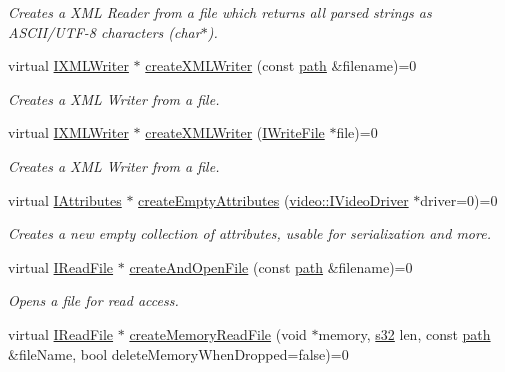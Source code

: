\begin{DoxyCompactItemize}
\begin{DoxyCompactList}\small\item\em Creates a X\+ML Reader from a file which returns all parsed strings as A\+S\+C\+I\+I/\+U\+T\+F-\/8 characters (char$\ast$). \end{DoxyCompactList}\item 
virtual \hyperlink{classirr_1_1io_1_1IXMLWriter}{I\+X\+M\+L\+Writer} $\ast$ \hyperlink{classirr_1_1io_1_1IFileSystem_a0737712d1c90001e5765ef46912c616d}{create\+X\+M\+L\+Writer} (const \hyperlink{namespaceirr_1_1io_a6468281622ce3a1c46b72e19f32dded5}{path} \&filename)=0
\begin{DoxyCompactList}\small\item\em Creates a X\+ML Writer from a file. \end{DoxyCompactList}\item 
virtual \hyperlink{classirr_1_1io_1_1IXMLWriter}{I\+X\+M\+L\+Writer} $\ast$ \hyperlink{classirr_1_1io_1_1IFileSystem_ac2bcaf8c338e80ff579061b7056c06da}{create\+X\+M\+L\+Writer} (\hyperlink{classirr_1_1io_1_1IWriteFile}{I\+Write\+File} $\ast$file)=0
\begin{DoxyCompactList}\small\item\em Creates a X\+ML Writer from a file. \end{DoxyCompactList}\item 
virtual \hyperlink{classirr_1_1io_1_1IAttributes}{I\+Attributes} $\ast$ \hyperlink{classirr_1_1io_1_1IFileSystem_a50f91cd88b926751367dac153c1cefd2}{create\+Empty\+Attributes} (\hyperlink{classirr_1_1video_1_1IVideoDriver}{video\+::\+I\+Video\+Driver} $\ast$driver=0)=0
\begin{DoxyCompactList}\small\item\em Creates a new empty collection of attributes, usable for serialization and more. \end{DoxyCompactList}\item 
virtual \hyperlink{classirr_1_1io_1_1IReadFile}{I\+Read\+File} $\ast$ \hyperlink{classirr_1_1io_1_1IFileSystem_a3678bb77e12cc6ee2b3947f4c79f6c90}{create\+And\+Open\+File} (const \hyperlink{namespaceirr_1_1io_a6468281622ce3a1c46b72e19f32dded5}{path} \&filename)=0
\begin{DoxyCompactList}\small\item\em Opens a file for read access. \end{DoxyCompactList}\item 
virtual \hyperlink{classirr_1_1io_1_1IReadFile}{I\+Read\+File} $\ast$ \hyperlink{classirr_1_1io_1_1IFileSystem_ac60a4b7912a7f2364426dc1aaf9bccae}{create\+Memory\+Read\+File} (void $\ast$memory, \hyperlink{namespaceirr_ac66849b7a6ed16e30ebede579f9b47c6}{s32} len, const \hyperlink{namespaceirr_1_1io_a6468281622ce3a1c46b72e19f32dded5}{path} \&file\+Name, bool delete\+Memory\+When\+Dropped=false)=0

\end{DoxyCompactItemize}
